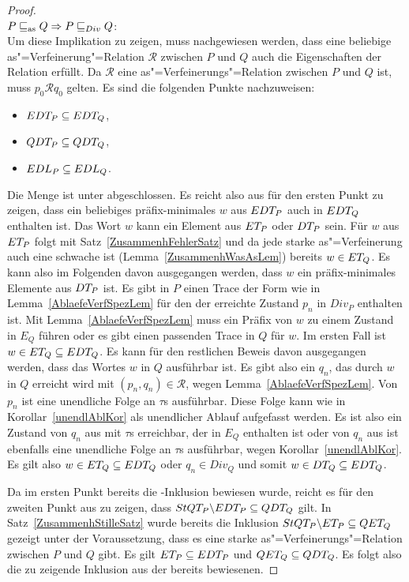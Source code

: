 \begin{proof}\mbox{}\\
  $P \sqsubseteq _{\mathrm{as}} Q \Rightarrow P  \sqsubseteq  _{Div} Q$:\\
  Um diese Implikation zu zeigen, muss nachgewiesen werden, dass eine beliebige
  as"=Verfeinerung"=Relation $\mathcal{R}$ zwischen $P$ und $Q$ auch die
  Eigenschaften der Relation \DRel{} erfüllt. Da $\mathcal{R}$ eine
  as"=Verfeinerungs"=Relation zwischen $P$ und $Q$ ist, muss $p_0 \mathcal{R}
  q_0$ gelten. Es sind die folgenden Punkte nachzuweisen:
  \begin{itemize}
    \item $EDT _P \subseteq EDT _Q$,
    \item $QDT _P \subseteq QDT _Q$,
    \item $EDL _P \subseteq EDL _Q$.
  \end{itemize}

  Die Menge \EDT{} ist unter \cont{} abgeschlossen. Es reicht also aus für den
  ersten Punkt zu zeigen, dass ein beliebiges präfix-minimales $w$ aus $EDT
  _P$ auch in $EDT _Q$ enthalten ist. Das Wort $w$ kann ein Element aus $ET
  _P$ oder $DT _P$ sein. Für $w$ aus $ET _P$ folgt mit
  Satz~\ref{ZusammenhFehlerSatz} und da jede starke as"=Verfeinerung auch eine
  schwache ist (Lemma~\ref{ZusammenhWasAsLem}) bereits $w\in ET _Q$. Es kann
  also im Folgenden davon ausgegangen werden, dass $w$ ein präfix-minimales
  Elemente aus $DT _P$ ist. Es gibt in $P$ einen Trace der Form wie in
  Lemma~\ref{AblaefeVerfSpezLem} für den der erreichte Zustand $p_n$ in $Div_P$
  enthalten ist. Mit Lemma~\ref{AblaefeVerfSpezLem} muss ein Präfix von $w$ zu
  einem Zustand in $E_Q$ führen oder es gibt einen passenden Trace in $Q$ für
  $w$. Im ersten Fall ist $w\in ET _Q \subseteq EDT _Q$. Es kann für den
  restlichen Beweis davon ausgegangen werden, dass das Wortes $w$ in $Q$
  ausführbar ist. Es gibt also ein $q_n$, das durch $w$ in $Q$ erreicht wird
  mit $(p_n,q_n)\in\mathcal{R}$, wegen Lemma~\ref{AblaefeVerfSpezLem}. Von
  $p_n$ ist eine unendliche Folge an $\tau$s ausführbar. Diese Folge kann wie
  in Korollar~\ref{unendlAblKor} als unendlicher Ablauf aufgefasst werden. Es
  ist also ein Zustand von $q_n$ aus mit $\tau$s erreichbar, der in $E_Q$
  enthalten ist oder von $q_n$ aus ist ebenfalls eine unendliche Folge an
  $\tau$s ausführbar, wegen Korollar~\ref{unendlAblKor}. Es gilt also $w\in ET
  _Q\subseteq EDT _Q$ oder $q_n\in Div _Q$ und somit $w\in DT _Q\subseteq EDT
  _Q$.

  Da im ersten Punkt bereits die \EDT{}-Inklusion bewiesen wurde, reicht es
  für den zweiten Punkt aus zu zeigen, dass $StQT _P\backslash EDT _P
  \subseteq QDT _Q$ gilt. In Satz~\ref{ZusammenhStilleSatz} wurde bereits die
  Inklusion $StQT _P \backslash ET _P \subseteq QET _Q$ gezeigt unter der
  Voraussetzung, dass es eine starke as"=Verfeinerungs"=Relation zwischen
  $P$ und $Q$ gibt. Es gilt $ET _P \subseteq EDT _P$ und $QET _Q \subseteq
  QDT _Q$. Es folgt also die zu zeigende Inklusion aus der bereits bewiesenen.


\end{proof}
